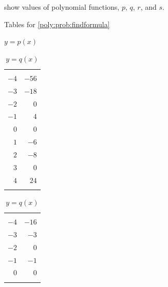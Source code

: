 \begin{exercises}
	 \begin{problem}\label{poly:prob:findformula}
	  show values of polynomial functions, $p$, $q$,
	 $r$, and $s$.

	 \begin{table}[!htb]
		 \centering
		 \begin{widepage}
		 \caption{Tables for \cref{poly:prob:findformula}}
		 \label{poly:tab:findformula}
		 \begin{subtable}{.2\textwidth}
			 \centering
			 \caption{$y=p(x)$}
			 \label{poly:tab:findformulap}
			 \begin{tabular}{rr}
				 \beforeheading
				 \heading{$x$} & \heading{$y$} \\
				 \afterheading
				 $-4$          & $-56$         \\\normalline
				 $-3$          & $-18$         \\\normalline
				 $-2$          & $0$           \\\normalline
				 $-1$          & $4$           \\\normalline
				 $0$           & $0$           \\\normalline
				 $1$           & $-6$          \\\normalline
				 $2$           & $-8$          \\\normalline
				 $3$           & $0$           \\\normalline
				 $4$           & $24$          \\\lastline
			 \end{tabular}
		 \end{subtable}
		 \hfill
		 \begin{subtable}{.2\textwidth}
			 \centering
			 \caption{$y=q(x)$}
			 \label{poly:tab:findformulaq}
			 \begin{tabular}{rr}
				 \beforeheading
				 \heading{$x$} & \heading{$y$} \\ \afterheading
				 $-4$          & $-16$         \\\normalline
				 $-3$          & $-3$          \\\normalline
				 $-2$          & $0$           \\\normalline
				 $-1$          & $-1$          \\\normalline
				 $0$           & $0$           \\\normalline

\end{tabular}
\end{subtable}
\end{widepage}
\end{table}
\end{problem}
\end{exercises}
